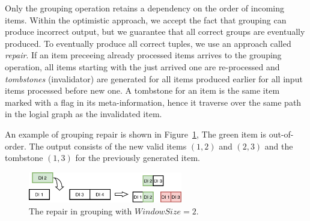 Only the grouping operation retains a dependency on the order of incoming items. 
%
Within the  optimistic approach, we accept the fact that grouping can produce incorrect output, but we guarantee that all correct groups are eventually produced. 
To eventually produce all correct tuples, we use an approach called {\it repair}. 
If an item preceeing already processed items arrives to the grouping operation, all items starting with the just arrived one are re-processed and {\em tombstones} (invalidator) are generated for all items produced earlier for all input items processed before new one. 
A tombstone for an item is the same item marked with a flag in its meta-information, hence it traverse over the same path in the logial graph as the invalidated item.



An example of grouping repair is shown in Figure~\ref{grouping-replaying}, 
The green item is out-of-order. 
The output consists of the new valid items  $(1, 2)$ and $(2, 3)$  and the tombstone $(1, 3)$ for the previously generated item.

\begin{figure}[ht]
  \centering
  \includegraphics[width=0.6\textwidth]{pics/grouping-replaying}
  \caption{The repair in grouping with $WindowSize = 2$. %
  }
  \label {grouping-replaying}
\end{figure}

